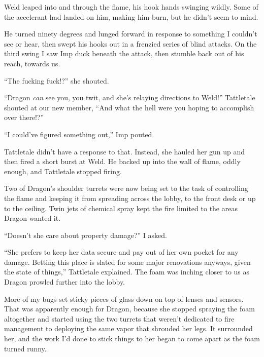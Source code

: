 Weld leaped into and through the flame, his hook hands swinging wildly.  Some of the accelerant had landed on him, making him burn, but he didn't seem to mind.



He turned ninety degrees and lunged forward in response to something I couldn't see or hear, then swept his hooks out in a frenzied series of blind attacks.  On the third swing I saw Imp duck beneath the attack, then stumble back out of his reach, towards us.



``The fucking fuck!?'' she shouted.



``Dragon \emph{can} see you, you twit, and she's relaying directions to Weld!'' Tattletale shouted at our new member, ``And what the hell were you hoping to accomplish over there!?''



``I could've figured something out,'' Imp pouted.



Tattletale didn't have a response to that.  Instead, she hauled her gun up and then fired a short burst at Weld.  He backed up into the wall of flame, oddly enough, and Tattletale stopped firing.



Two of Dragon's shoulder turrets were now being set to the task of controlling the flame and keeping it from spreading across the lobby, to the front desk or up to the ceiling.   Twin jets of chemical spray kept the fire limited to the areas Dragon wanted it.



``Doesn't she care about property damage?'' I asked.



``She prefers to keep her data secure and pay out of her own pocket for any damage.  Betting this place is slated for some major renovations anyways, given the state of things,'' Tattletale explained.  The foam was inching closer to us as Dragon prowled further into the lobby.



More of my bugs set sticky pieces of glass down on top of lenses and sensors.  That was apparently enough for Dragon, because she stopped spraying the foam altogether and started using the two turrets that weren't dedicated to fire management to deploying the same vapor that shrouded her legs.  It surrounded her, and the work I'd done to stick things to her began to come apart as the foam turned runny.



